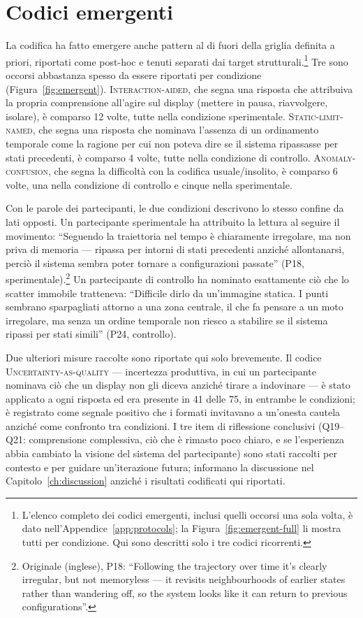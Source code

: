 \section{Codici emergenti}
\label{sec:res-emergent}

La codifica ha fatto emergere anche pattern al di fuori della griglia definita a priori, riportati come post-hoc e tenuti separati dai target strutturali.\footnote{L'elenco completo dei codici emergenti, inclusi quelli occorsi una sola volta, è dato nell'Appendice~\ref{app:protocols}; la Figura~\ref{fig:emergent-full} li mostra tutti per condizione. Qui sono descritti solo i tre codici ricorrenti.} Tre sono occorsi abbastanza spesso da essere riportati per condizione (Figura~\ref{fig:emergent}). \textsc{Interaction-aided}, che segna una risposta che attribuiva la propria comprensione all'agire sul display (mettere in pausa, riavvolgere, isolare), è comparso 12 volte, tutte nella condizione sperimentale. \textsc{Static-limit-named}, che segna una risposta che nominava l'assenza di un ordinamento temporale come la ragione per cui non poteva dire se il sistema ripassasse per stati precedenti, è comparso 4 volte, tutte nella condizione di controllo. \textsc{Anomaly-confusion}, che segna la difficoltà con la codifica usuale/insolito, è comparso 6 volte, una nella condizione di controllo e cinque nella sperimentale.

Con le parole dei partecipanti, le due condizioni descrivono lo stesso confine da lati opposti. Un partecipante sperimentale ha attribuito la lettura al seguire il movimento: ``Seguendo la traiettoria nel tempo è chiaramente irregolare, ma non priva di memoria --- ripassa per intorni di stati precedenti anziché allontanarsi, perciò il sistema sembra poter tornare a configurazioni passate'' (P18, sperimentale).\footnote{Originale (inglese), P18: ``Following the trajectory over time it's clearly irregular, but not memoryless --- it revisits neighbourhoods of earlier states rather than wandering off, so the system looks like it can return to previous configurations''.} Un partecipante di controllo ha nominato esattamente ciò che lo scatter immobile tratteneva: ``Difficile dirlo da un'immagine statica. I punti sembrano sparpagliati attorno a una zona centrale, il che fa pensare a un moto irregolare, ma senza un ordine temporale non riesco a stabilire se il sistema ripassi per stati simili'' (P24, controllo).

Due ulteriori misure raccolte sono riportate qui solo brevemente. Il codice \textsc{Uncertainty-as-quality} --- incertezza produttiva, in cui un partecipante nominava ciò che un display non gli diceva anziché tirare a indovinare --- è stato applicato a ogni risposta ed era presente in 41 delle 75, in entrambe le condizioni; è registrato come segnale positivo che i formati invitavano a un'onesta cautela anziché come confronto tra condizioni. I tre item di riflessione conclusivi (Q19--Q21: comprensione complessiva, ciò che è rimasto poco chiaro, e se l'esperienza abbia cambiato la visione del sistema del partecipante) sono stati raccolti per contesto e per guidare un'iterazione futura; informano la discussione nel Capitolo~\ref{ch:discussion} anziché i risultati codificati qui riportati.

